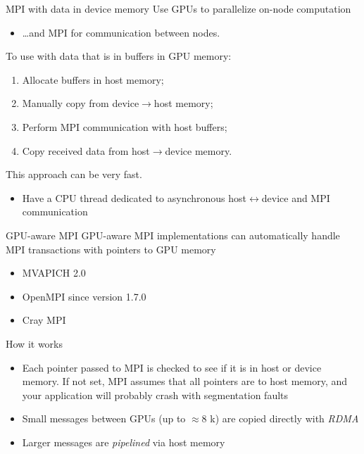 \documentclass[aspectratio=43]{beamer}
\begin{document}
\begin{frame}[fragile]{MPI with data in device memory}
    Use GPUs to parallelize on-node computation
    \begin{itemize}
        \item \dots and MPI for communication between nodes.
    \end{itemize}
    To use with data that is in buffers in GPU memory:
    \begin{enumerate}
        \item Allocate buffers in host memory;
        \item Manually copy from device$\rightarrow$host memory;
        \item Perform MPI communication with host buffers;
        \item Copy received data from host$\rightarrow$device memory.
    \end{enumerate}
    This approach can be very fast.
    \begin{itemize}
        \item Have a CPU thread dedicated to asynchronous host$\leftrightarrow$device and MPI communication
    \end{itemize}
\end{frame}

\begin{frame}[fragile]{GPU-aware MPI}
        GPU-aware MPI implementations can automatically handle MPI transactions with pointers to GPU memory
        \begin{itemize}
            \item MVAPICH 2.0
            \item OpenMPI since version 1.7.0
            \item Cray MPI
        \end{itemize}

    \begin{info}{How it works}
        \begin{itemize}
            \item Each pointer passed to MPI is checked to see if it is in host or device memory.
            If not set, MPI assumes that all pointers are to host memory, and your application will probably crash with segmentation faults
            \item Small messages between GPUs (up to $\approx$8 k) are copied directly with \emph{RDMA}
            \item Larger messages are \emph{pipelined} via host memory
        \end{itemize}
    \end{info}

\end{frame}
\end{document}
